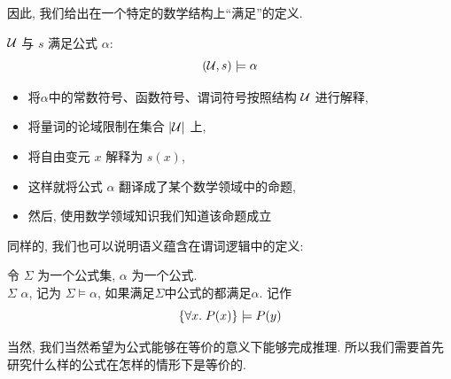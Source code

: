 因此, 我们给出在一个特定的数学结构上``满足''的定义. 

\begin{definition}
    $\mathcal{U}$ 与 $s$ 满足公式 $\alpha$:
  \[
    (\mathcal{U}, s) \models \alpha
  \]
  \begin{itemize}
    \setlength{\itemsep}{6pt}
    \item 将$\alpha$中的常数符号、函数符号、谓词符号按照结构 $\mathcal{U}$ 进行解释,
    \item 将量词的论域限制在集合 $|\mathcal{U}|$ 上,
    \item 将自由变元 $x$ 解释为 $s(x)$,
    \item 这样就将公式 $\alpha$ 翻译成了某个数学领域中的命题,
    \item 然后, 使用数学领域知识我们知道该命题成立
  \end{itemize}
\end{definition}

同样的, 我们也可以说明语义蕴含在谓词逻辑中的定义: 

\begin{definition}
    令 $\Sigma$ 为一个公式集, $\alpha$ 为一个公式.  \\[8pt]
    $\Sigma$  $\alpha$, 记为 $\Sigma \models \alpha$, 
    如果满足$\Sigma$中公式的都满足$\alpha$. 
    记作
    \[
    \{\forall x.\; P(x)\} \models P(y)
  \]
\end{definition}

当然, 我们当然希望为公式能够在等价的意义下能够完成推理. 所以我们需要首先研究什么样的公式在怎样的情形下是等价的.

